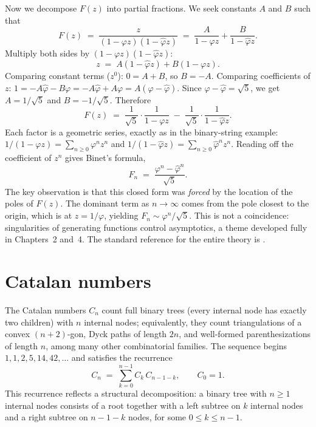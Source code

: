 Now we decompose $F(z)$ into partial fractions. We seek constants $A$ and $B$ such that
\[
  F(z) \;=\; \frac{z}{(1-\varphi z)(1-\hat\varphi z)} \;=\; \frac{A}{1-\varphi z} + \frac{B}{1-\hat\varphi z}.
\]
Multiply both sides by $(1-\varphi z)(1-\hat\varphi z)$:
\[
  z \;=\; A(1-\hat\varphi z) + B(1-\varphi z).
\]
Comparing constant terms ($z^0$): $0 = A + B$, so $B = -A$. Comparing coefficients of $z$: $1 = -A\hat\varphi - B\varphi = -A\hat\varphi + A\varphi = A(\varphi - \hat\varphi)$. Since $\varphi - \hat\varphi = \sqrt{5}$, we get $A = 1/\sqrt{5}$ and $B = -1/\sqrt{5}$. Therefore
\[
  F(z) \;=\; \frac{1}{\sqrt{5}}\cdot\frac{1}{1 - \varphi z} \;-\; \frac{1}{\sqrt{5}}\cdot\frac{1}{1 - \hat\varphi z}.
\]
Each factor is a geometric series, exactly as in the binary-string example: $1/(1-\varphi z) = \sum_{n \ge 0} \varphi^n z^n$ and $1/(1-\hat\varphi z) = \sum_{n \ge 0} \hat\varphi^n z^n$. Reading off the coefficient of $z^n$ gives Binet's formula,
\[
  F_n \;=\; \frac{\varphi^n - \hat\varphi^n}{\sqrt{5}}.
\]
The key observation is that this closed form was \emph{forced} by the location of the poles of $F(z)$. The dominant term as $n \to \infty$ comes from the pole closest to the origin, which is at $z = 1/\varphi$, yielding $F_n \sim \varphi^n / \sqrt{5}$. This is not a coincidence: singularities of generating functions control asymptotics, a theme developed fully in Chapters~2 and~4. The standard reference for the entire theory is \cite{FlajoletSedgewick2009}.

\section*{Catalan numbers}

The Catalan numbers $C_n$ count full binary trees (every internal node has exactly two children) with $n$ internal nodes; equivalently, they count triangulations of a convex $(n+2)$-gon, Dyck paths of length $2n$, and well-formed parenthesizations of length $n$, among many other combinatorial families. The sequence begins $1, 1, 2, 5, 14, 42, \ldots$ and satisfies the recurrence
\[
  C_n \;=\; \sum_{k=0}^{n-1} C_k\, C_{n-1-k}, \qquad C_0 = 1.
\]
This recurrence reflects a structural decomposition: a binary tree with $n \ge 1$ internal nodes consists of a root together with a left subtree on $k$ internal nodes and a right subtree on $n-1-k$ nodes, for some $0 \le k \le n-1$.

